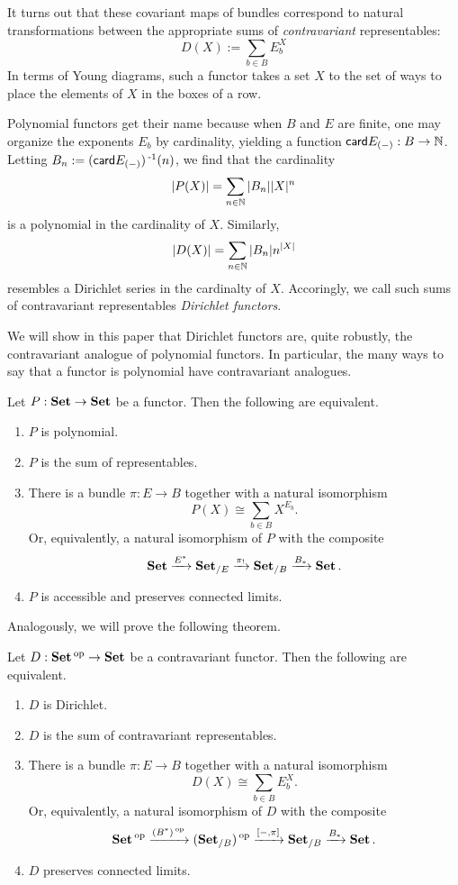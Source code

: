 It turns out that these covariant maps of bundles correspond to natural
transformations between the appropriate sums of \emph{contravariant}
representables:
$$D(X) := \sum_{b \in B} E_b^X$$
In terms of Young diagrams, such a functor takes a set $X$ to the set of ways to
place the elements of $X$ in the boxes of a row.

Polynomial functors get their name because when $B$ and $E$ are finite, one may
organize the exponents $E_b$ by cardinality, yielding a function
$\mathsf{{card}}E_{(-)} : B \to \operatorname{\mathbb{N}}$. Letting $B_n := (\mathsf{{card}}E_{(-)})\operatorname{^{-1}}(n)$,
we find that the cardinality
$$|P(X)| = \sum_{n \in \operatorname{\mathbb{N}}} |B_n||X|^n$$
is a polynomial in the cardinality of $X$. Similarly,
$$|D(X)| = \sum_{n \in \operatorname{\mathbb{N}}} |B_n|n^{|X|}$$
resembles a Dirichlet series in the cardinalty of $X$. Accoringly, we call such
sums of contravariant representables \emph{Dirichlet functors}.

We will show in this paper that Dirichlet functors are, quite robustly, the
contravariant analogue of polynomial functors. In particular, the many ways to
say that a functor is polynomial have contravariant analogues.
\begin{thm}[cite]\label{thm:polynomial.set.characterization}
  Let $P : \operatorname{\textbf{Set}} \to \operatorname{\textbf{Set}}$ be a functor. Then the following are equivalent.
  \begin{enumerate}
  \item $P$ is polynomial.
  \item $P$ is the sum of representables.
  \item There is a bundle $\pi : E \to B$ together with a natural isomorphism
    $$P(X) \cong \sum_{b \in B} X^{E_b}.$$
    Or, equivalently, a natural isomorphism of $P$ with the composite
    $$\operatorname{\textbf{Set}} \xrightarrow{E^{\ast}} \operatorname{\textbf{Set}}_{/E} \xrightarrow{\pi_!} \operatorname{\textbf{Set}}_{/B} \xrightarrow{B_\ast} \operatorname{\textbf{Set}}.$$
  \item $P$ is accessible and preserves connected limits.
  \end{enumerate}
\end{thm}

Analogously, we will prove the following theorem.
\begin{thm}\label{thm:dirichlet.set.characterization}
Let $D : \operatorname{\textbf{Set}}\operatorname{^\text{op}} \to \operatorname{\textbf{Set}}$ be a contravariant functor. Then the following are
equivalent.
\begin{enumerate}
\item $D$ is Dirichlet.
\item $D$ is the sum of contravariant representables.
\item There is a bundle $\pi : E \to B$ together with a natural isomorphism
  $$D(X) \cong \sum_{b \in B} E_b^X.$$
  Or, equivalently, a natural isomorphism of $D$ with the composite
  $$\operatorname{\textbf{Set}}\operatorname{^\text{op}} \xrightarrow{(B^{\ast})\operatorname{^\text{op}}} (\operatorname{\textbf{Set}}_{/B})\operatorname{^\text{op}} \xrightarrow{[-, \pi]} \operatorname{\textbf{Set}}_{/B}
  \xrightarrow{B_{\ast}} \operatorname{\textbf{Set}}.$$
\item $D$ preserves connected limits.
\end{enumerate}
\end{thm}

